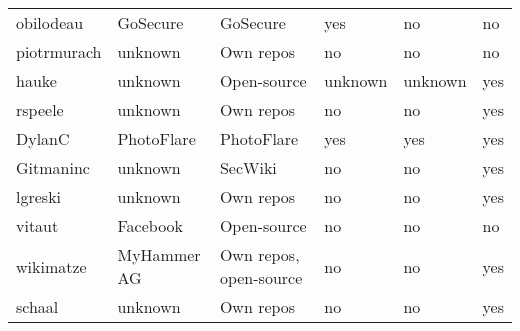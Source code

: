 \begin{landscape}
\begin{table}[]
\begin{tabular}{llllll}
            obilodeau     & GoSecure      & GoSecure                           & yes             & no                     & no             \\
            piotrmurach   & unknown       & Own repos                          & no              & no                     & no             \\
            hauke         & unknown       & Open-source                        & unknown         & unknown                & yes            \\
            rspeele       & unknown       & Own repos                          & no              & no                     & yes            \\
            DylanC        & PhotoFlare    & PhotoFlare                         & yes             & yes                    & yes            \\
            Gitmaninc     & unknown       & SecWiki                            & no              & no                     & yes            \\
            lgreski       & unknown       & Own repos                          & no              & no                     & yes            \\
            vitaut        & Facebook      & Open-source                        & no              & no                     & no             \\
            wikimatze     & MyHammer AG   & Own repos, open-source             & no              & no                     & yes            \\
            schaal        & unknown       & Own repos                          & no              & no                     & yes            \\
            \bottomrule
        \end{tabular}
    \end{table}
\end{landscape}
